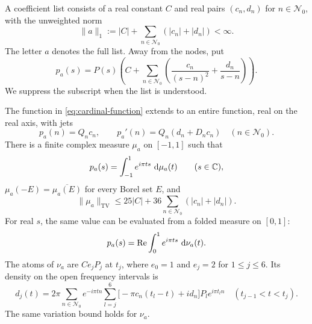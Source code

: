 A coefficient list consists of a real constant \(C\) and real pairs
\((c_n,d_n)\) for \(n\in\mathcal N_0\), with the unweighted norm
\[
 \|a\|_1:=|C|+\sum_{n\in\mathcal N_0}(|c_n|+|d_n|)<\infty.
\]
The letter \(a\) denotes the full list.  Away from the nodes, put
\begin{equation}\label{eq:cardinal-function}
 p_a(s)=P(s)\left(C+
       \sum_{n\in\mathcal N_0}
          \left(\frac{c_n}{(s-n)^2}+\frac{d_n}{s-n}\right)\right).
\end{equation}
We suppress the subscript when the list is understood.

\begin{lemma}\label{lem:cardinal-measure}
The function in \eqref{eq:cardinal-function} extends to an entire function,
real on the real axis, with jets
\begin{equation}\label{eq:cardinal-jets}
 p_a(n)=Q_nc_n,\qquad p_a'(n)=Q_n(d_n+D_nc_n)
       \quad(n\in\mathcal N_0).
\end{equation}
There is a finite complex measure \(\mu_a\) on \([-1,1]\) such that
\begin{equation}\label{eq:full-measure}
 p_a(s)=\int_{-1}^{1}e^{i\pi ts}\,\mathop{}\!\mathrm d\mu_a(t)\qquad(s\in\mathbb C),
\end{equation}
\(\mu_a(-E)=\overline{\mu_a(E)}\) for every Borel set \(E\), and
\begin{equation}\label{eq:spectral-variation}
 \|\mu_a\|_{\mathrm{TV}}
 \le 25|C|+36\sum_{n\in\mathcal N_0}(|c_n|+|d_n|).
\end{equation}
For real \(s\), the same value can be evaluated from a folded measure on
\([0,1]\):
\begin{equation}\label{eq:folded-evaluation}
 p_a(s)=\operatorname{Re}\int_0^1e^{i\pi ts}\,\mathop{}\!\mathrm d\nu_a(t).
\end{equation}
The atoms of \(\nu_a\) are \(Ce_jP_j\) at \(t_j\), where \(e_0=1\) and
\(e_j=2\) for \(1\le j\le6\).  Its density on the open frequency intervals is
\begin{equation}\label{eq:folded-density}
 d_j(t)=2\pi\sum_{n\in\mathcal N_0}e^{-i\pi tn}
       \sum_{l=j}^{6}
           \bigl[-\pi c_n(t_l-t)+id_n\bigr]P_le^{i\pi t_ln}
 \quad(t_{j-1}<t<t_j).
\end{equation}
The same variation bound holds for \(\nu_a\).
\end{lemma}

